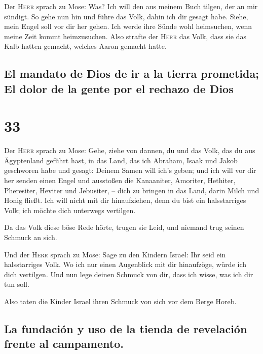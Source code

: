  Der \textsc{Herr} sprach zu Mose: Was? Ich will den aus
meinem Buch tilgen, der an mir sündigt.  So gehe nun hin
und führe das Volk, dahin ich dir gesagt habe. Siehe, mein Engel soll
vor dir her gehen. Ich werde ihre Sünde wohl heimsuchen, wenn meine Zeit
kommt heimzusuchen.  Also strafte der \textsc{Herr} das
Volk, dass sie das Kalb hatten gemacht, welches Aaron gemacht hatte.

\hypertarget{el-mandato-de-dios-de-ir-a-la-tierra-prometida-el-dolor-de-la-gente-por-el-rechazo-de-dios}{%
\subsection{El mandato de Dios de ir a la tierra prometida; El dolor de
la gente por el rechazo de
Dios}\label{el-mandato-de-dios-de-ir-a-la-tierra-prometida-el-dolor-de-la-gente-por-el-rechazo-de-dios}}

\hypertarget{section-32}{%
\section{33}\label{section-32}}

 Der \textsc{Herr} sprach zu Mose: Gehe, ziehe von dannen,
du und das Volk, das du aus Ägyptenland geführt hast, in das Land, das
ich Abraham, Isaak und Jakob geschworen habe und gesagt: Deinem Samen
will ich's geben;  und ich will vor dir her senden einen
Engel und ausstoßen die Kanaaniter, Amoriter, Hethiter, Pheresiter,
Heviter und Jebusiter, --  dich zu bringen in das Land,
darin Milch und Honig fließt. Ich will nicht mit dir hinaufziehen, denn
du bist ein halsstarriges Volk; ich möchte dich unterwegs vertilgen.

 Da das Volk diese böse Rede hörte, trugen sie Leid, und
niemand trug seinen Schmuck an sich.

 Und der \textsc{Herr} sprach zu Mose: Sage zu den Kindern
Israel: Ihr seid ein halsstarriges Volk. Wo ich nur einen Augenblick mit
dir hinaufzöge, würde ich dich vertilgen. Und nun lege deinen Schmuck
von dir, dass ich wisse, was ich dir tun soll.

 Also taten die Kinder Israel ihren Schmuck von sich vor
dem Berge Horeb.

\hypertarget{la-fundaciuxf3n-y-uso-de-la-tienda-de-revelaciuxf3n-frente-al-campamento.}{%
\subsection{La fundación y uso de la tienda de revelación frente al
campamento.}\label{la-fundaciuxf3n-y-uso-de-la-tienda-de-revelaciuxf3n-frente-al-campamento.}}

